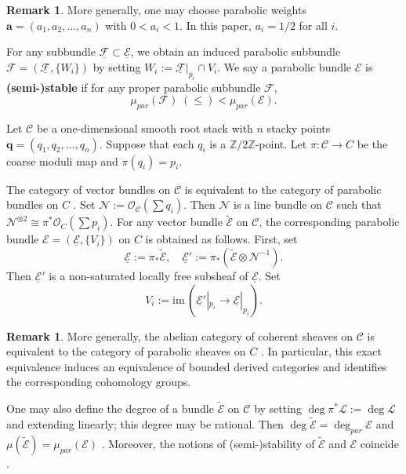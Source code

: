 \documentclass[12pt, letterpaper]{amsart}
\theoremstyle{definition}
\newtheorem{remark}[theorem]{Remark}
\newcommand{\ZZ}{\mathbb{Z} }
\newcommand{\cC}{\mathcal{C} }
\newcommand{\cE}{\mathcal{E} }
\newcommand{\cF}{\mathcal{F} }
\newcommand{\cL}{\mathcal{L} }
\newcommand{\cN}{\mathcal{N} }
\newcommand{\cO}{\mathcal{O} }
\newcommand{\ba}{\mathbf{a} }
\newcommand{\bq}{\bsq }
\newcommand{\bsq}{\mathbf{q} }
\newcommand{\parmu}{\mu_{par}}
\newcommand{\pardeg}{\deg_{par}}
\def\im{\mathrm{im}\, }
\begin{document}
\begin{remark}
More generally, one may choose parabolic weights \(\ba = (a_1, a_2, \dots, a_n)\) with \(0 < a_i < 1\). In this paper, \(a_i = 1/2\) for all \(i\).
\end{remark}

For any subbundle \(\underline{\cF} \subset \underline{\cE}\), we obtain an induced parabolic subbundle \(\cF = (\underline{\cF}, \{W_i\})\) by setting \(W_i := \underline{\cF}|_{p_i} \cap V_i\). We say a parabolic bundle \(\cE\) is \textbf{(semi-)stable} if for any proper parabolic subbundle \(\cF\),
\[\parmu(\cF) \;(\le) < \parmu(\cE).\]

Let \(\cC\) be a one-dimensional smooth root stack with \(n\) stacky points \(\bq = (q_1, q_2, \dots, q_n)\). Suppose that each \(q_i\) is a \(\ZZ/2\ZZ\)-point. Let \(\pi : \cC \to C\) be the coarse moduli map and \(\pi(q_i)=p_i\).

The category of vector bundles on \(\cC\) is equivalent to the category of parabolic bundles on \(C\) \cite[Theorem~3.13]{Bor07}. Set \(\cN := \cO_{\cC}(\sum q_i)\). Then \(\cN\) is a line bundle on \(\cC\) such that \(\cN^{\otimes 2} \cong \pi^*\cO_{C}(\sum p_i)\). For any vector bundle \(\widetilde{\cE}\) on \(\cC\), the corresponding parabolic bundle \(\cE = (\underline{\cE}, \{V_i\})\) on \(C\) is obtained as follows. First, set
\[\underline{\cE} := \pi_*\widetilde{\cE}, \quad \underline{\cE}' := \pi_*(\widetilde{\cE} \otimes \cN^{-1}).\]
Then \(\underline{\cE}'\) is a non-saturated locally free subsheaf of \(\underline{\cE}\). Set
\[V_i := \im (\underline{\cE}'|_{p_i} \to \underline{\cE}|_{p_i}).\]
\begin{remark}
More generally, the abelian category of coherent sheaves on \(\cC\) is equivalent to the category of parabolic sheaves on \(C\) \cite[Theorem~6.1]{BV12}. In particular, this exact equivalence induces an equivalence of bounded derived categories and identifies the corresponding cohomology groups.
\end{remark}

One may also define the degree of a bundle \(\widetilde{\cE}\) on \(\cC\) by setting \(\deg \pi^*\cL := \deg \cL\) and extending linearly; this degree may be rational. Then \(\deg \widetilde{\cE} = \pardeg \cE\) and \(\mu(\widetilde{\cE}) = \parmu(\cE)\) \cite[Theorem~4.3]{Bor07}. Moreover, the notions of (semi-)stability of \(\widetilde{\cE}\) and \(\cE\) coincide \cite[Remark~5.9]{Bor07}.
\end{document}
